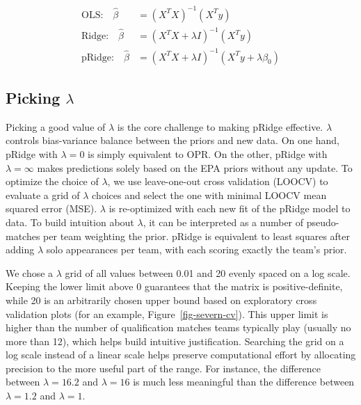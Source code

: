 \documentclass[
  12pt]{article}
\begin{document}
\[
\begin{aligned}
\text{OLS:} \quad \hat{\beta} &= (X^TX)^{-1}(X^Ty) \\
\text{Ridge:} \quad \hat{\beta} &= (X^TX + \lambda I)^{-1}(X^Ty) \\
\text{pRidge:} \quad \hat{\beta} &= (X^TX + \lambda I)^{-1}(X^Ty + \lambda \beta_0)
\end{aligned}
\]

\subsection{\texorpdfstring{Picking
\(\lambda\)}{Picking \textbackslash lambda}}\label{picking-lambda}

Picking a good value of \(\lambda\) is the core challenge to making
pRidge effective. \(\lambda\) controls bias-variance balance
\citep[sec.~2.2.2]{ISLR} between the priors and new data. On one hand,
pRidge with \(\lambda = 0\) is simply equivalent to OPR. On the other,
pRidge with \(\lambda = \infty\) makes predictions solely based on the
EPA priors without any update. To optimize the choice of \(\lambda\), we
use leave-one-out cross validation (LOOCV) \citep[pp.~200--203]{ISLR} to
evaluate a grid of \(\lambda\) choices and select the one with minimal
LOOCV mean squared error (MSE). \(\lambda\) is re-optimized with each
new fit of the pRidge model to data. To build intuition about
\(\lambda\), it can be interpreted as a number of pseudo-matches per
team weighting the prior. pRidge is equivalent to least squares after
adding \(\lambda\) solo appearances per team, with each scoring exactly
the team's prior.

We chose a \(\lambda\) grid of all values between 0.01 and 20 evenly
spaced on a log scale. Keeping the lower limit above 0 guarantees that
the matrix is positive-definite, while 20 is an arbitrarily chosen upper
bound based on exploratory cross validation plots (for an example,
Figure~\ref{fig-severn-cv}). This upper limit is higher than the number
of qualification matches teams typically play (usually no more than 12),
which helps build intuitive justification. Searching the grid on a log
scale instead of a linear scale helps preserve computational effort by
allocating precision to the more useful part of the range. For instance,
the difference between \(\lambda = 16.2\) and \(\lambda = 16\) is much
less meaningful than the difference between \(\lambda = 1.2\) and
\(\lambda = 1\).
\end{document}
